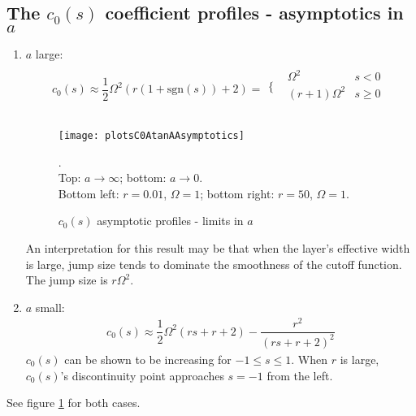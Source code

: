 \documentclass[12pt,twoside]{report}
\begin{document}
\subsection{The $c_0(s)$ coefficient profiles - asymptotics in $a$  } 

\begin{enumerate}
\item $a$ large: 
\begin{align}
\label{eqns:1-D-time-harmonic-E3_s_Atan_coef_0_non_dim_a_inf}
	c_0(s) \approx \dfrac{1}{2} \Omega ^2 (r (1+\text{sgn}(s))+2) = \begin{array}{cc}
	\Big \{ & 
	\begin{array}{cc}
	 \Omega ^2 & s<0 \\
 	(r+1) \Omega ^2 & s \geq 0 \\
	\end{array}
 	\\
	\end{array}
\end{align}
	
\begin{figure}
\begin{center}
\texttt{[image: plotsC0AtanAAsymptotics]}
\end{center}
\caption {$c_0(s)$ asymptotic profiles - limits in $a$}.\\
Top: $a \rightarrow \infty$; bottom: $a \rightarrow 0$.\\
Bottom left: $r=0.01$, $\Omega = 1$; bottom right: $r=50$, $\Omega = 1$.
\label{fig:c0AtanAlim}
\end{figure}


An interpretation for this result may be that when the layer's effective width is large, jump size tends to dominate the smoothness of the cutoff function. The jump size is $r \Omega^2$.
\item $a$ small:
\begin{align}
c_0(s) \approx \dfrac{1}{2} \Omega ^2 (r s+r+2)-\dfrac{r^2}{(r s+r +2)^2}
\end{align}
$c_0(s)$ can be shown to be increasing for $-1\leq s \leq 1$.  When $r$ is large, $c_0(s)$'s discontinuity point approaches	$s=-1$ from the left.
\end{enumerate}
\begin{comment}
	calculating the $s$-derivative,
	\begin{align*}
	c_0'(s) = \dfrac{2 r^3}{(r s+r+2)^3}+\dfrac{r \Omega ^2}{2} 
	\end{align*}
\end{comment}
See figure \ref{fig:c0AtanAlim} for both cases.
\end{document}
